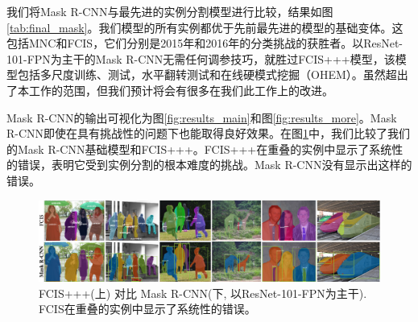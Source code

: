 我们将Mask R-CNN与最先进的实例分割模型进行比较，结果如图\ref{tab:final_mask}。我们模型的所有实例都优于先前最先进的模型的基础变体。这包括MNC和FCIS，它们分别是2015年和2016年的分类挑战的获胜者。以ResNet-101-FPN为主干的Mask R-CNN无需任何调参技巧，就胜过FCIS+++模型，该模型包括多尺度训练、测试，水平翻转测试和在线硬模式挖掘（OHEM）。虽然超出了本工作的范围，但我们预计将会有很多在我们此工作上的改进。

Mask R-CNN的输出可视化为图\ref{fig:results_main}和图\ref{fig:results_more}。Mask R-CNN即使在具有挑战性的问题下也能取得良好效果。在图\ref{fig:results_vs_fcis}中，我们比较了我们的Mask R-CNN基础模型和FCIS+++。FCIS+++在重叠的实例中显示了系统性的错误，表明它受到实例分割的根本难度的挑战。Mask R-CNN没有显示出这样的错误。

\begin{figure}[t]
\centering
\includegraphics[width=1.0\linewidth]{figures/mask_rcnn/results_vs_fcis}
\caption{FCIS+++(上) 对比 Mask R-CNN(下, 以ResNet-101-FPN为主干). FCIS在重叠的实例中显示了系统性的错误。}
\label{fig:results_vs_fcis}
\end{figure}

